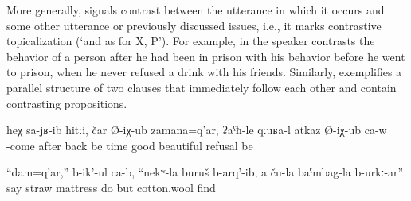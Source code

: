 More generally,  signals contrast between the utterance in which it occurs and some other utterance or previously discussed issues, i.e., it marks contrastive topicalization (`and as for X, P'). For example, in  the speaker contrasts the behavior of a person after he had been in prison with his behavior before he went to prison, when he never refused a drink with his friends. Similarly,  exemplifies a parallel structure of two clauses that immediately follow each other and contain contrasting propositions.
%
\begin{exe}
	\ex	\label{ex:‎After he came back, he refused very well minor}
	\gll	heχ	sa-jʁ-ib hitːi,	čar	Ø-iχ-ub zamana=q'ar,	ʡaˁħ-le	qːuʁa-l	atkaz	Ø-iχ-ub	ca-w\\
			-come	after	back	be	time	good\tsc{-advz}	beautiful	refusal	be	\\
	\glt	{}

	\ex	\label{ex:The (fox) says, For me they made a bed from herbs and grass, and for themselves they took probably cotton wool minor}
	\gll	``dam=q'ar,''	b-ik'-ul	ca-b,	``nekʷ-la	buruš	b-arq'-ib,	a ču-la	baˁmbag-la	b-urkː-ar''\\
			say		straw	mattress	do	but			cotton.wool	find\\
	\glt	{}
\end{exe}

